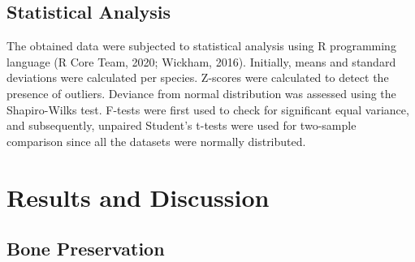 \documentclass[review]{elsarticle} %
\begin{document}
\hypertarget{statistical-analysis}{%
\subsection{Statistical Analysis}\label{statistical-analysis}}

The obtained data were subjected to statistical analysis using R programming language (R Core Team, 2020; Wickham, 2016). Initially, means and standard deviations were calculated per species. Z-scores were calculated to detect the presence of outliers. Deviance from normal distribution was assessed using the Shapiro-Wilks test. F-tests were first used to check for significant equal variance, and subsequently, unpaired Student's t-tests were used for two-sample comparison since all the datasets were normally distributed.

\hypertarget{results-and-discussion}{%
\section{Results and Discussion}\label{results-and-discussion}}

\hypertarget{bone-preservation}{%
\subsection{Bone Preservation}\label{bone-preservation}}

\begingroup\fontsize{7.5}{9.5}\selectfont
\end{document}
